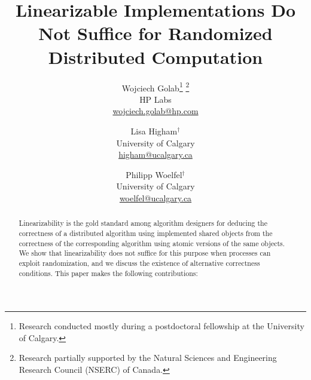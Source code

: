 \documentclass[11pt,letterpaper]{article}
\begin{document}
\title{Linearizable Implementations Do Not Suffice for Randomized Distributed Computation }
\author{Wojciech Golab\thanks{Research conducted mostly during a postdoctoral fellowship at the University of Calgary.}\,\,\thanks{
Research partially supported by the Natural Sciences and Engineering Research Council (NSERC) of Canada.}\\
HP Labs\\
\url{wojciech.golab@hp.com}
\and
Lisa Higham{$^\dag$}\\
University of Calgary\\
\url{higham@ucalgary.ca}
\and Philipp Woelfel{$^\dag$}\\
University of Calgary\\
\url{woelfel@ucalgary.ca}
}


\begin{titlepage}
\maketitle
\thispagestyle{empty}

\begin{abstract}
Linearizability is the gold standard among algorithm designers for deducing the correctness of a distributed algorithm
using implemented shared objects from the correctness of the corresponding algorithm using atomic versions of the same objects.
We show that linearizability does not suffice for this purpose when processes can exploit randomization,
and we discuss the existence of alternative correctness conditions.
This paper makes the following contributions:
\begin{itemize}


\end{itemize}
\end{abstract}
\end{titlepage}
\end{document}
